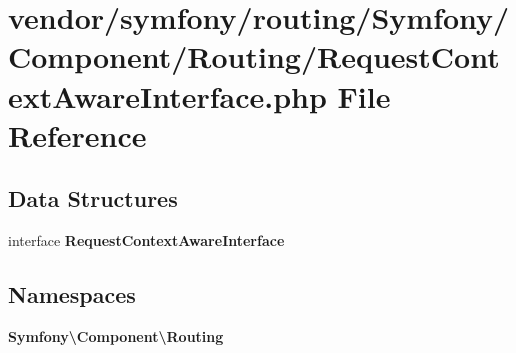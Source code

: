 \section{vendor/symfony/routing/\+Symfony/\+Component/\+Routing/\+Request\+Context\+Aware\+Interface.php File Reference}
\label{_request_context_aware_interface_8php}
\subsection*{Data Structures}
\begin{DoxyCompactItemize}
\item 
interface {\bf Request\+Context\+Aware\+Interface}
\end{DoxyCompactItemize}
\subsection*{Namespaces}
\begin{DoxyCompactItemize}
\item 
 {\bf Symfony\textbackslash{}\+Component\textbackslash{}\+Routing}
\end{DoxyCompactItemize}
